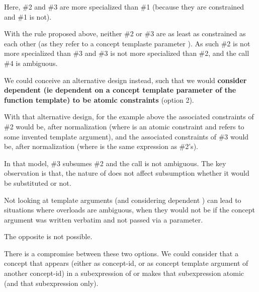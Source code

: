 \documentclass{wg21}
\begin{document}
Here, \#2 and \#3 are more specialized than \#1 (because they are constrained and \#1 is not).

With the rule proposed above, neither \#2 or \#3 are as least as constrained as each other (as they refer to a concept templaste parameter ).
As such \#2 is not more specialized than \#3 and \#3 is not more specialized than \#2, and the call \#4 is ambiguous.

We could conceive an alternative design instead, such that we would \textbf{consider dependent  (ie dependent on a concept template parameter of the function template) to be atomic constraints} (option 2).

With that alternative design, for the example above the associated constraints of \#2 would be, after normalization  (where  is an atomic constraint and  refers to some invented template argument), and the associated constraints of \#3 would be, after normalization  (where  is the same expression as \#2's).

In that model, \#3 subsumes \#2 and the call is not ambiguous.
The key observation is that, the nature of  does not affect subsumption whether it would be substituted or not.

Not looking at template arguments (and considering dependent ) can lead to situations where
overloads are ambiguous, when they would not be if the concept argument was written verbatim and not passed via a parameter.


The opposite is not possible.

There is a compromise between these two options. We could consider
that a concept that appears (either as concept-id, or as concept template argument of another concept-id) in a subexpression of \tcode{\&\&} or \tcode{||}
makes that subexpression atomic (and that subexpression only).
\end{document}
